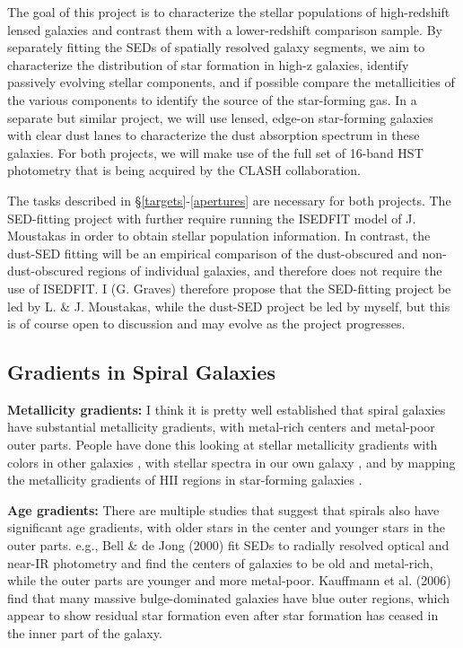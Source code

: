 \documentclass{emulateapj}
\begin{document}
The goal of this project is to characterize the stellar populations of
high-redshift lensed galaxies and contrast them with a lower-redshift
comparison sample.  By separately fitting the SEDs of spatially
resolved galaxy segments, we aim to characterize the distribution of
star formation in high-z galaxies, identify passively evolving stellar
components, and if possible compare the metallicities of the various
components to identify the source of the star-forming gas.  In a
separate but similar project, we will use lensed, edge-on star-forming
galaxies with clear dust lanes to characterize the dust absorption
spectrum in these galaxies.  For both projects, we will make use of
the full set of 16-band HST photometry that is being acquired by the
CLASH collaboration.

The tasks described in \S\ref{targets}-\ref{apertures} are necessary
for both projects.  The SED-fitting project with further require
running the ISEDFIT model of J. Moustakas in order to obtain stellar
population information.  In contrast, the dust-SED fitting will be an
empirical comparison of the dust-obscured and non-dust-obscured
regions of individual galaxies, and therefore does not require the use
of ISEDFIT.  I (G. Graves) therefore propose that the SED-fitting
project be led by L. \& J. Moustakas, while the dust-SED project be
led by myself, but this is of course open to discussion and may evolve
as the project progresses.

\subsection{Gradients in Spiral Galaxies}

{\bf Metallicity gradients:} I think it is pretty well established that
spiral galaxies have substantial metallicity gradients, with
metal-rich centers and metal-poor outer parts.  People have done this
looking at stellar metallicity gradients with colors in other galaxies
\citep[e.g.][]{Bell:00}, with stellar spectra in our own galaxy
\citep[e.g.][]{Ivezic:08}, and by mapping the metallicity gradients
of HII regions in star-forming galaxies \citep[e.g.][]{Zaritsky:94}. 
  
{\bf Age gradients:} There are multiple studies that suggest that spirals
also have significant age gradients, with older stars in the center
and younger stars in the outer parts.  e.g., Bell \& de Jong (2000)
fit SEDs to radially resolved optical and near-IR photometry and find
the centers of galaxies to be old and metal-rich, while the outer
parts are younger and more metal-poor.  Kauffmann et al. (2006) find
that many massive bulge-dominated galaxies have blue outer regions,
which appear to show residual star formation even after star formation
has ceased in the inner part of the galaxy.
\end{document}
